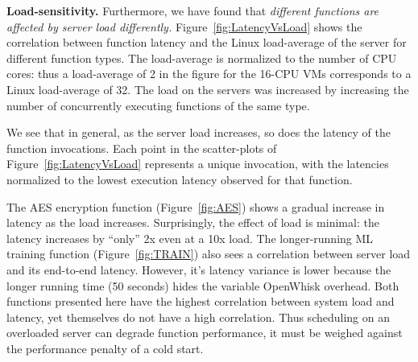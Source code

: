 

\noindent \textbf{Load-sensitivity.} 
Furthermore, we have found that \emph{different functions are affected by server load differently.}
%
Figure~\ref{fig:LatencyVsLoad} shows the correlation between function latency and the Linux load-average of the server for different function types. 
The load-average is normalized to the number of CPU cores: thus a load-average of 2 in the figure for the 16-CPU VMs corresponds to a Linux load-average of 32.
The load on the servers was increased by increasing the number of concurrently executing functions of the same type.


We see that in general, as the server load increases, so does the latency of the function invocations.
Each point in the scatter-plots of Figure~\ref{fig:LatencyVsLoad} represents a unique invocation, with the latencies normalized to the lowest execution latency observed for that function.

The AES encryption function (Figure~\ref{fig:AES}) shows a gradual increase in latency as the load increases.
Surprisingly, the effect of load is minimal: the latency increases by ``only'' 2x even at a 10x load. 
The longer-running ML training function (Figure~\ref{fig:TRAIN}) also sees a correlation between server load and its end-to-end latency.
However, it's latency variance is lower because the longer running time (50 seconds) hides the variable OpenWhisk overhead.
Both functions presented here have the highest correlation between system load and latency, yet themselves do not have a high correlation.
Thus scheduling on an overloaded server can degrade function performance, it must be weighed against the performance penalty of a cold start.

